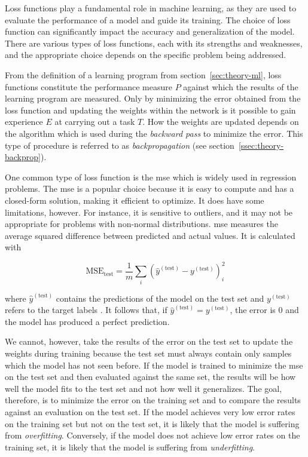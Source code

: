 \documentclass[final]{vutinfth} %
\begin{document}
Loss functions play a fundamental role in machine learning, as they
are used to evaluate the performance of a model and guide its
training. The choice of loss function can significantly impact the
accuracy and generalization of the model. There are various types of
loss functions, each with its strengths and weaknesses, and the
appropriate choice depends on the specific problem being addressed.

From the definition of a learning program from
section~\ref{sec:theory-ml}, loss functions constitute the performance
measure $P$ against which the results of the learning program are
measured. Only by minimizing the error obtained from the loss function
and updating the weights within the network is it possible to gain
experience $E$ at carrying out a task $T$. How the weights are updated
depends on the algorithm which is used during the \emph{backward pass}
to minimize the error. This type of procedure is referred to as
\emph{backpropagation} (see section~\ref{ssec:theory-backprop}).

One common type of loss function is the \gls{mse} which is widely used
in regression problems. The \gls{mse} is a popular choice because it
is easy to compute and has a closed-form solution, making it efficient
to optimize. It does have some limitations, however. For instance, it
is sensitive to outliers, and it may not be appropriate for problems
with non-normal distributions. \gls{mse} measures the average squared
difference between predicted and actual values. It is calculated with

\begin{equation}
  \label{eq:mse}
  \mathrm{MSE_{test}} = \frac{1}{m}\sum_i(\hat{y}^{(\mathrm{test})} - y^{(\mathrm{test})})_i^2
\end{equation}

where $\hat{y}^{(\mathrm{test})}$ contains the predictions of the
model on the test set and $y^{(\mathrm{test})}$ refers to the target
labels \cite{goodfellow2016}. It follows that, if
$\hat{y}^{(\mathrm{test})} = y^{(\mathrm{test})}$, the error is $0$
and the model has produced a perfect prediction.

We cannot, however, take the results of the error on the test set to
update the weights during training because the test set must always
contain only samples which the model has not seen before. If the model
is trained to minimize the \gls{mse} on the test set and then
evaluated against the same set, the results will be how well the model
fits to the test set and not how well it generalizes. The goal,
therefore, is to minimize the error on the training set and to compare
the results against an evaluation on the test set. If the model
achieves very low error rates on the training set but not on the test
set, it is likely that the model is suffering from
\emph{overfitting}. Conversely, if the model does not achieve low
error rates on the training set, it is likely that the model is
suffering from \emph{underfitting}.
\end{document}
